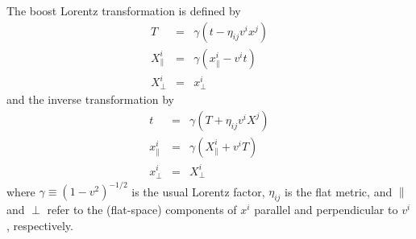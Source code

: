 The boost Lorentz transformation is defined by
\begin{equation}
\renewcommand{\arraystretch}{1.333}
\begin{array}{lcl}
T		& = &	\gamma (t - \eta_{ij} v^i x^j)		\\
X^i_\parallel	& = &	\gamma (x^i_\parallel - v^i t)		\\
X^i_\perp	& = &	x^i_\perp				%
\end{array}
\end{equation}
and the inverse transformation by
\begin{equation}
\renewcommand{\arraystretch}{1.333}
\begin{array}{lcl}
t		& = &	\gamma (T + \eta_{ij} v^i X^j)		\\
x^i_\parallel	& = &	\gamma (X^i_\parallel + v^i T)		\\
x^i_\perp	& = &	X^i_\perp				%
\end{array}
\end{equation}
where $\gamma \equiv (1 - v^2)^{-1/2}$ is the usual Lorentz factor,
$\eta_{ij}$ is the flat metric, and $\parallel$ and $\perp$ refer
to the (flat-space) components of $x^i$ parallel and perpendicular
to $v^i$, respectively.

